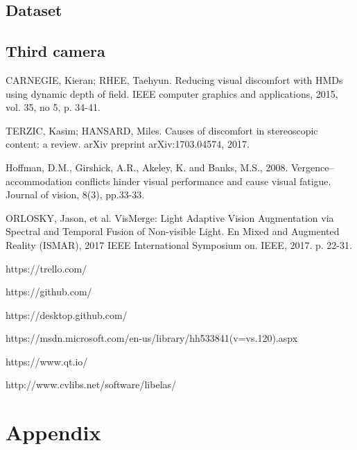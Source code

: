 \documentclass[10pt,a4paper,twocolumn,twoside]{article}
\begin{document}
\subsection{Dataset}

\subsection{Third camera}


\begin{thebibliography}{11}
CARNEGIE, Kieran; RHEE, Taehyun. Reducing visual discomfort with HMDs using dynamic depth of field. IEEE computer graphics and applications, 2015, vol. 35, no 5, p. 34-41.

TERZIC, Kasim; HANSARD, Miles. Causes of discomfort in stereoscopic content: a review. arXiv preprint arXiv:1703.04574, 2017.

Hoffman, D.M., Girshick, A.R., Akeley, K. and Banks, M.S., 2008. Vergence–accommodation conflicts hinder visual performance and cause visual fatigue. Journal of vision, 8(3), pp.33-33.

ORLOSKY, Jason, et al. VisMerge: Light Adaptive Vision Augmentation via Spectral and Temporal Fusion of Non-visible Light. En Mixed and Augmented Reality (ISMAR), 2017 IEEE International Symposium on. IEEE, 2017. p. 22-31.

https://trello.com/

https://github.com/

https://desktop.github.com/

https://msdn.microsoft.com/en-us/library/hh533841(v=vs.120).aspx

https://www.qt.io/

http://www.cvlibs.net/software/libelas/

\end{thebibliography}

\appendix

\section*{Appendix}
\end{document}
